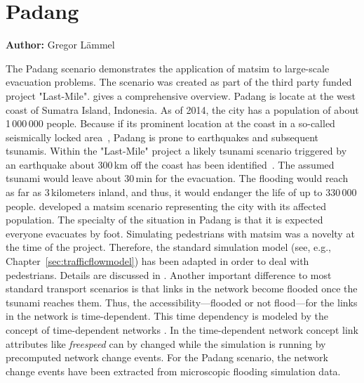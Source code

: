 \section{Padang}
\label{sec:padang}
\hfill \textbf{Author:} Gregor Lämmel

The Padang scenario demonstrates the application of \gls{matsim} to large-scale evacuation problems. The scenario was created as part of the third party funded project "Last-Mile". \citet{TaubenboeckEtAl2012ConcludingLastMilePaperNatHazards} gives a comprehensive overview.
Padang is locate at the west coast of Sumatra Island, Indonesia. As of 2014, the city has a population of about 1\,000\,000 people. 
Because if its prominent location at the coast in a so-called seismically locked area~\citep{McCloskey2010Padang2009Earthquake}, Padang is prone to earthquakes and subsequent tsunamis. Within the "Last-Mile" project a likely tsunami scenario triggered by an earthquake about 300\,km off the coast has been identified~\citep{GosebergSchlurmann2009HazardMappingPadang}. The assumed tsunami would leave about 30\,min for the evacuation. The flooding would reach as far as 3\,kilometers inland, and thus, it would endanger the life of up to 330\,000 people. \citet{Laemmel_PhDThesis_2011} developed a \gls{matsim} scenario representing the city with its affected population. The specialty of the situation in Padang is that it is expected everyone evacuates by foot. Simulating pedestrians with \gls{matsim} was a novelty at the time of the project. Therefore, the standard simulation model (see, e.g.,\,Chapter~\ref{sec:trafficflowmodel}) has been adapted in order to deal with pedestrians. 
Details are discussed in \citet{LaemmelKluepfelNagel2009EvacPadangAtBookTimmermanns}. Another important difference to most standard transport scenarios is that links in the network become flooded once the tsunami reaches them. Thus, the accessibility---flooded or not flood---for the links in the network is time-dependent. This time dependency is modeled by the concept of time-dependent networks \citep{LaemmelEtAl_TransResC_2010}. In the time-dependent network concept link attributes like \emph{freespeed} can by changed while the simulation is running by precomputed network change events. For the Padang scenario, the network change events have been extracted from microscopic flooding simulation data.
